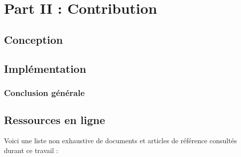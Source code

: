 \documentclass[12pt,a4paper]{report}
\begin{document}
\part*{Part II : Contribution}
\thispagestyle{empty}

\chapter{Conception}



\chapter{Implémentation}


\section*{Conclusion générale}


\chapter*{Ressources en ligne}
Voici une liste non exhaustive de documents et articles de référence consultés durant ce travail :
\end{document}
